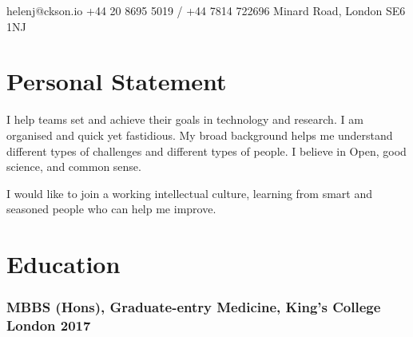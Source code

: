 \documentclass[a4paper, oneside, final, 11pt]{scrartcl} %
\begin{document}



\bigskip

\faEnvelopeO \space helenj@ckson.io \hfill \faMobile \space +44 20 8695 5019 / +44 7814 722696 \hfill \faHome {} Minard Road, London SE6 1NJ

\medskip

\section{Personal Statement}
I help teams set and achieve their goals in technology and research. I am organised and quick yet fastidious. My broad background helps me understand different types of challenges and different types of people. I believe in Open, good science, and common sense.\par
\medskip
I would like to join a working intellectual culture, learning from smart and seasoned people who can help me improve.


\section{Education}

\subsubsection*{MBBS (Hons), Graduate-entry Medicine, King's College London \hfill 2017}  
\end{document}
